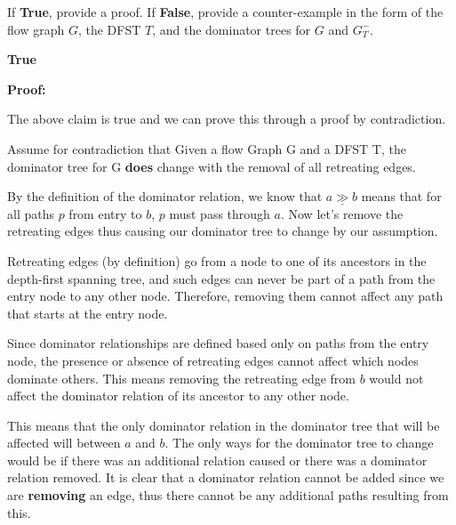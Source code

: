 \documentclass[12pt]{article}
\newcommand{\dom}{\underline{\gg}}
\begin{document}
\begin{enumerate}
      If \textbf{True}, provide a proof.
      If \textbf{False}, provide a counter-example in the form of the flow graph
      $G$, the DFST $T$, and the dominator trees for $G$  and $G_T^-$.

      \begin{mdframed}
        \textbf{True}

        \textbf{Proof:}

        The above claim is true and we can prove this through a proof by contradiction.
            
                   \vspace{.5em}
    
            Assume for contradiction that Given a flow Graph G and a DFST T, the dominator tree for G \textbf{does} change with the removal of all retreating edges.
    
            \vspace{0.5em}
            
            By the definition of the dominator relation, we know that $a \dom b$ means that for all paths $p$ from entry to $b$, $p$ must pass through $a$. Now let's remove the retreating edges thus causing our dominator tree to change by our assumption.
             \vspace{0.5em}
    
            Retreating edges (by definition) go from a node to one of its ancestors in the depth-first spanning tree, and such edges can never be part of a path from the entry node to any other node. Therefore, removing them cannot affect any path that starts at the entry node.
            
           \vspace{.5em}
           
            Since dominator relationships are defined based only on paths from the entry node, the presence or absence of retreating edges cannot affect which nodes dominate others. This means removing the retreating edge from $b$ would not affect the dominator relation of its ancestor to any other node. 
    
                  \vspace{.5em}
    
            This means that the only dominator relation in the dominator tree that will be affected will between $a$ and $b$. The only ways for the dominator tree to change would be if there was an additional relation caused or there was a dominator relation removed. It is clear that a dominator relation cannot be added since we are \textbf{removing} an edge, thus there cannot be any additional paths resulting from this.
    

\end{mdframed}
\end{enumerate}
\end{document}
